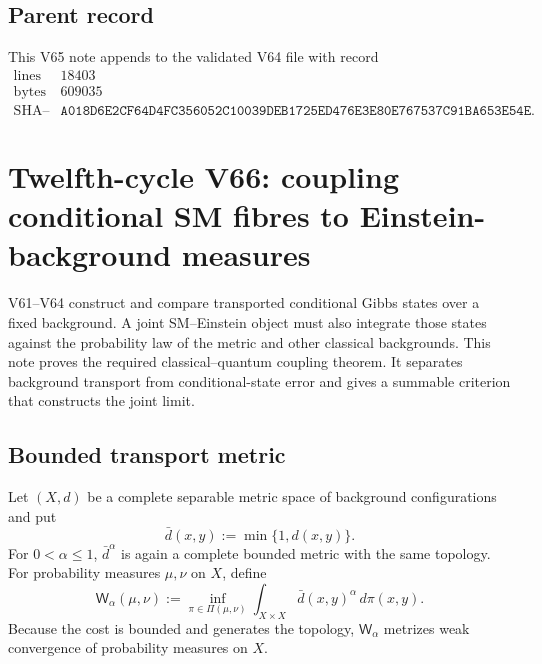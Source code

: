 \documentclass[11pt]{article}
\theoremstyle{remark}
\begin{document}
\subsection{Parent record}

This V65 note appends to the validated V64 file with record
\[
\begin{array}{c|c}
\text{lines}&18403\\
\text{bytes}&609035\\
\text{SHA--256}&
\texttt{A018D6E2CF64D4FC356052C10039DEB1725ED476E3E80E767537C91BA653E54E}.
\end{array}
\]


\section{Twelfth-cycle V66: coupling conditional SM fibres to
Einstein-background measures}
\label{sec:v12v66}

V61--V64 construct and compare transported conditional Gibbs states
over a fixed background.  A joint SM--Einstein object must also
integrate those states against the probability law of the metric and
other classical backgrounds.  This note proves the required
classical--quantum coupling theorem.  It separates background
transport from conditional-state error and gives a summable
criterion that constructs the joint limit.

\subsection{Bounded transport metric}

Let \((X,d)\) be a complete separable metric space of background
configurations and put
\begin{equation}
 \bar d(x,y):=\min\{1,d(x,y)\}.                   \tag{66.1}
\end{equation}
For \(0<\alpha\leq1\), \(\bar d^\alpha\) is again a complete bounded
metric with the same topology.  For probability measures
\(\mu,\nu\) on \(X\), define
\begin{equation}
 {\mathsf W}_\alpha(\mu,\nu)
 :=
 \inf_{\pi\in\Pi(\mu,\nu)}
 \int_{X\times X}\bar d(x,y)^\alpha\,d\pi(x,y).   \tag{66.2}
\end{equation}
Because the cost is bounded and generates the topology,
\({\mathsf W}_\alpha\) metrizes weak convergence of probability
measures on \(X\).
\end{document}
